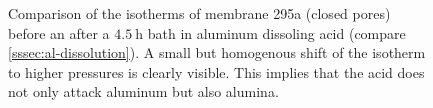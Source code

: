 \documentclass[../../../thesis.tex]{subfiles}
\begin{document}
\begin{figure}[ht]
    \label{fig:295a_al_diss}
    \caption{Comparison of the isotherms of membrane 295a (closed pores) before an after a $\SI{4,5}{\hour}$ bath in aluminum dissoling acid (compare \cref{sssec:al-dissolution}). A small but homogenous shift of the isotherm to higher pressures is clearly visible. This implies that the acid does not only attack aluminum but also alumina.}
  \end{figure}
\end{document}
